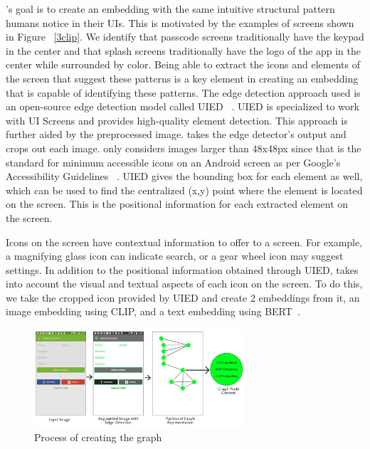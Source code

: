
 \FRAME's goal is to create an embedding with the same intuitive structural pattern humans notice in their UIs. This is motivated by the examples of screens shown in Figure ~\ref{3clip}. We identify that passcode screens traditionally have the keypad in the center and that splash screens traditionally have the logo of the app in the center while surrounded by color. Being able to extract the icons and elements of the screen that suggest these patterns is a key element in creating an embedding that is capable of identifying these patterns. The edge detection approach used is an open-source edge detection model called UIED ~\cite{UIED}. UIED is specialized to work with UI Screens and provides high-quality element detection. This approach is further aided by the preprocessed image. \FRAME takes the edge detector's output and crops out each image. \FRAME only considers images larger than 48x48px since that is the standard for minimum accessible icons on an Android screen as per Google's Accessibility Guidelines ~\cite{GoogleAccess}. UIED gives the bounding box for each element as well, which can be used to find the centralized (x,y) point where the element is located on the screen. This is the positional information for each extracted element on the screen. 



Icons on the screen have contextual information to offer to a screen. For example, a magnifying glass icon can indicate search, or a gear wheel icon may suggest settings. In addition to the positional information obtained through UIED, \FRAME takes into account the visual and textual aspects of each icon on the screen. To do this, we take the cropped icon provided by UIED and create 2 embeddings from it, an image embedding using CLIP, and a text embedding using BERT~\cite{BERT}.

\begin{figure}[h]
    \centering
    \includegraphics[width=0.7\textwidth]{imgs/graphCreation.png}
    \caption{Process of creating the graph}
    \label{graphCreation}
\end{figure}


